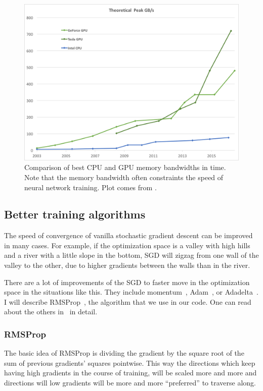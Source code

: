 \begin{figure}[h]
  \includegraphics[width=\linewidth]{images/gpu-bandwidth.png}
  \caption{Comparison of best CPU and GPU memory bandwidths in time. Note that the memory bandwidth often constraints the speed of neural network training. Plot comes from \cite{nvidia-docs}.}\label{nvidia-speed}
\end{figure}

\subsection{Better training algorithms}
The speed of convergence of vanilla stochastic gradient descent can be improved in many cases. For example, if the optimization space is a valley with high hills and a river with a little slope in the bottom, SGD will zigzag from one wall of the valley to the other, due to higher gradients between the walls than in the river.

There are a lot of improvements of the SGD to faster move in the optimization space in the situations like this. They include momentum~\cite{momentum}, Adam~\cite{adam}, or Adadelta~\cite{adadelta}. I will describe RMSProp~\cite{rmsprop}, the algorithm that we use in our code. One can read about the others in~\cite[chapter 8.3.]{dlbook} in detail.

\subsubsection{RMSProp}\label{rmsprop-section}%
The basic idea of RMSProp is dividing the gradient by the square root of the sum of previous gradients' squares pointwise. This way the directions which keep having high gradients in the course of training, will be scaled more and more and directions will low gradients will be more and more ``preferred'' to traverse along.

